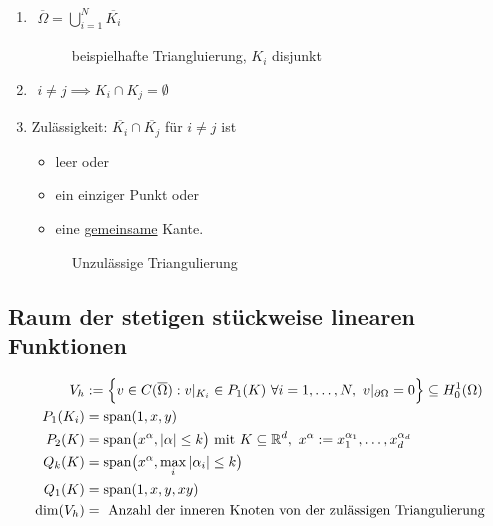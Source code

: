 \begin{enumerate}[label=(\roman*)]
\item $\begin{aligned}
\overline{\Omega}=\bigcup\limits_{i=1}^N \overline{K_i}
\end{aligned}$ 

\begin{figure}[h!]
\begin{center}

\caption{beispielhafte Triangluierung, $K_i$ disjunkt}
\label{AbbTriangulierung}
\end{center}
\end{figure}

\item $\begin{aligned}
i\neq j\implies K_i\cap K_j=\emptyset
\end{aligned}$
\item Zulässigkeit: $\overline{K_i}\cap\overline{K_j}$ für $i\neq j$ ist
\begin{itemize}
\item leer oder
\item ein einziger Punkt oder
\item eine \ul{gemeinsame} Kante.
\end{itemize}

\begin{figure}[h!]
\begin{center}

\caption{Unzulässige Triangulierung}
\label{AbbUnzulaessigeTriangulierung}
\end{center}
\end{figure}
\end{enumerate}

\subsection*{Raum der stetigen stückweise linearen Funktionen}
\begin{align*}
V_h&:=\Big\lbrace v\in C(\overline{\Omega}) : v|_{K_i}\in P_1(K)~\forall i=1,\ldots,N,~v|_{\partial\Omega}=0\Big\rbrace\subseteq H^1_0(\Omega)\\
P_1(K_i)&=\text{span}(1,x,y)\\
P_2(K)&=\text{span}\big( x^\alpha, |\alpha|\leq k\big)\text{ mit } K\subseteq\mathbb{R}^d,~ x^{\alpha}:=x_1^{\alpha_1},\ldots,x_d^{\alpha_d}\\
Q_k(K)&=\text{span}\big(x^\alpha,\max\limits_i |\alpha_i|\leq k\big)\\
Q_1(K)&=\text{span}(1,x,y,xy)\\
\dim(V_h)&=\text{ Anzahl der inneren Knoten von der zulässigen Triangulierung}\\
\end{align*}

